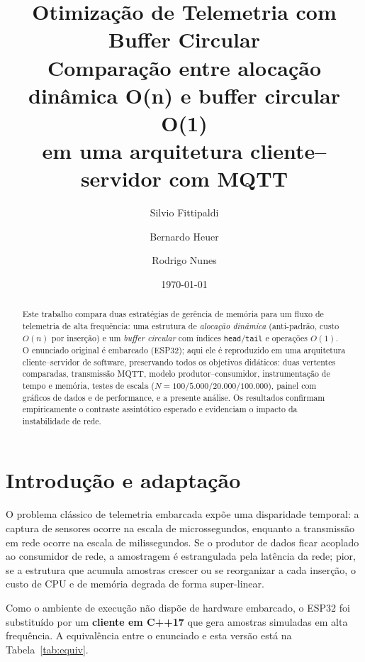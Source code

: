 \documentclass[11pt,a4paper]{article}
\title{\textbf{Otimização de Telemetria com Buffer Circular}\\[4pt]
\large Comparação entre alocação dinâmica O(n) e buffer circular O(1)\\
em uma arquitetura cliente--servidor com MQTT}
\author{Silvio Fittipaldi \and Bernardo Heuer \and Rodrigo Nunes}
\date{\today}
\begin{document}
\maketitle

\begin{abstract}
Este trabalho compara duas estratégias de gerência de memória para um fluxo de
telemetria de alta frequência: uma estrutura de \emph{alocação dinâmica}
(anti-padrão, custo $O(n)$ por inserção) e um \emph{buffer circular} com índices
\texttt{head}/\texttt{tail} e operações $O(1)$. O enunciado original é embarcado
(ESP32); aqui ele é reproduzido em uma arquitetura cliente--servidor de software,
preservando todos os objetivos didáticos: duas vertentes comparadas, transmissão
MQTT, modelo produtor--consumidor, instrumentação de tempo e memória, testes de
escala ($N = 100/5.000/20.000/100.000$), painel com gráficos de dados e de
performance, e a presente análise. Os resultados confirmam empiricamente o
contraste assintótico esperado e evidenciam o impacto da instabilidade de rede.
\end{abstract}

\section{Introdução e adaptação}

O problema clássico de telemetria embarcada expõe uma disparidade temporal: a
captura de sensores ocorre na escala de microssegundos, enquanto a transmissão
em rede ocorre na escala de milissegundos. Se o produtor de dados ficar acoplado
ao consumidor de rede, a amostragem é estrangulada pela latência da rede; pior,
se a estrutura que acumula amostras crescer ou se reorganizar a cada inserção, o
custo de CPU e de memória degrada de forma super-linear.

Como o ambiente de execução não dispõe de hardware embarcado, o ESP32 foi
substituído por um \textbf{cliente em C++17} que gera amostras simuladas em alta
frequência. A equivalência entre o enunciado e esta versão está na
Tabela~\ref{tab:equiv}.
\end{document}
